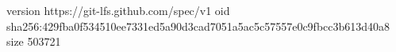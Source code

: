 version https://git-lfs.github.com/spec/v1
oid sha256:429fba0f534510ee7331ed5a90d3cad7051a5ac5c57557e0c9fbcc3b613d40a8
size 503721
